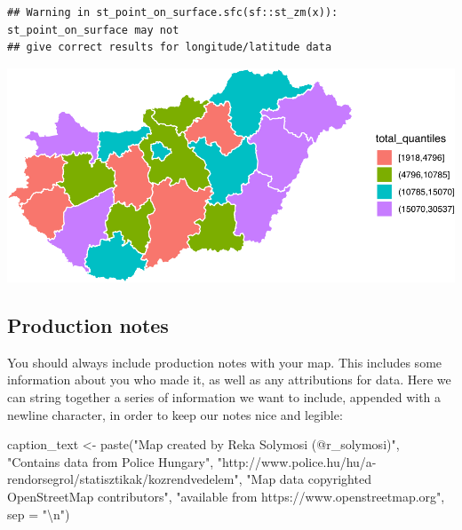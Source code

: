 \documentclass[
]{book}
\newenvironment{Shaded}{\begin{snugshade}}{\end{snugshade}}
\newcommand{\AttributeTok}[1]{\textcolor[rgb]{0.77,0.63,0.00}{#1}}
\newcommand{\FunctionTok}[1]{\textcolor[rgb]{0.00,0.00,0.00}{#1}}
\newcommand{\NormalTok}[1]{#1}
\newcommand{\OtherTok}[1]{\textcolor[rgb]{0.56,0.35,0.01}{#1}}
\newcommand{\SpecialCharTok}[1]{\textcolor[rgb]{0.00,0.00,0.00}{#1}}
\newcommand{\StringTok}[1]{\textcolor[rgb]{0.31,0.60,0.02}{#1}}
\begin{document}
\begin{verbatim}
## Warning in st_point_on_surface.sfc(sf::st_zm(x)): st_point_on_surface may not
## give correct results for longitude/latitude data
\end{verbatim}

\includegraphics{crime_mapping_files/figure-latex/unnamed-chunk-153-1.pdf}

\hypertarget{production-notes}{%
\subsection{Production notes}\label{production-notes}}

You should always include production notes with your map. This includes some information about you who made it, as well as any attributions for data. Here we can string together a series of information we want to include, appended with a newline character, in order to keep our notes nice and legible:

\begin{Shaded}
\begin{Highlighting}[]
\NormalTok{caption\_text }\OtherTok{\textless{}{-}} \FunctionTok{paste}\NormalTok{(}\StringTok{"Map created by Reka Solymosi (@r\_solymosi)"}\NormalTok{, }
                       \StringTok{"Contains data from Police Hungary"}\NormalTok{,}
                       \StringTok{"http://www.police.hu/hu/a{-}rendorsegrol/statisztikak/kozrendvedelem"}\NormalTok{, }
                       \StringTok{"Map data copyrighted OpenStreetMap contributors"}\NormalTok{, }
                       \StringTok{"available from https://www.openstreetmap.org"}\NormalTok{, }
                       \AttributeTok{sep =} \StringTok{"}\SpecialCharTok{\textbackslash{}n}\StringTok{"}\NormalTok{)}
\end{Highlighting}
\end{Shaded}
\end{document}
